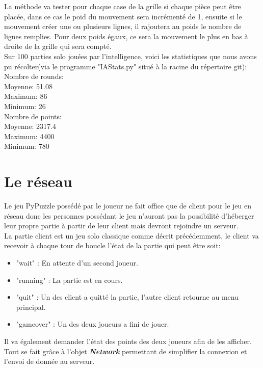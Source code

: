 \documentclass[a4paper]{report}
\begin{document}
La méthode va tester pour chaque case de la grille si chaque pièce peut être placée, dans ce cas le poid du mouvement sera incrémenté de 1, ensuite si le mouvement créer une ou plusieurs lignes, il rajoutera au poids le nombre de lignes remplies. Pour deux poids égaux, ce sera la mouvement le plus en bas à droite de la grille qui sera compté. \\

Sur 100 parties solo jouées par l'intelligence, voici les statistiques que nous avons pu récolter(via le programme "IAStats.py" situé à la racine du répertoire git): \\

Nombre de rounds:\\
Moyenne: 51.08\\
Maximum: 86\\
Minimum: 26\\

Nombre de points:\\
Moyenne: 2317.4\\
Maximum: 4400\\
Minimum: 780\\


\section{Le réseau}
Le jeu PyPuzzle possédé par le joueur ne fait office que de client pour le jeu en réseau donc les personnes possédant le jeu n'auront pas la possibilité d'héberger leur propre partie à partir de leur client mais devront rejoindre un serveur. \\

La partie client est un jeu solo classique comme décrit précédemment, le client va recevoir à chaque tour de boucle l'état de la partie qui peut être soit:
\begin{itemize}
	\item "wait" : En attente d'un second joueur.
	\item "running" : La partie est en cours.
	\item "quit" : Un des client a quitté la partie, l'autre client retourne au menu principal.
	\item "gameover" : Un des deux joueurs a fini de jouer.
\end{itemize}
Il va également demander l'état des points des deux joueurs afin de les afficher. Tout se fait grâce à l'objet \textbf{\textit{Network}} permettant de simplifier la connexion et l'envoi de donnée au serveur.\\
\end{document}
